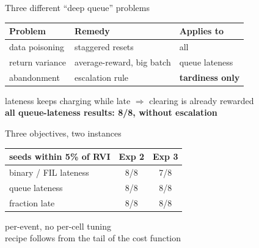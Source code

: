 \documentclass[12pt,aspectratio=169]{beamer}
\newcommand{\good}[1]{\textbf{#1}}
\begin{document}
\begin{frame}{Three different ``deep queue'' problems}

\begin{center}
\large
\begin{tabular}{lll}
\toprule
\textbf{Problem} & \textbf{Remedy} & \textbf{Applies to} \\
\midrule
data poisoning   & staggered resets            & all \\
return variance  & average-reward, big batch   & queue lateness \\
abandonment      & escalation rule             & \good{tardiness only} \\
\bottomrule
\end{tabular}
\end{center}

\vfill
\centering
lateness keeps charging while late $\Rightarrow$ clearing is already rewarded \\[4pt]
\good{all queue-lateness results: 8/8, without escalation}

\end{frame}

\begin{frame}{Three objectives, two instances}

\begin{center}
\Large
\begin{tabular}{lcc}
\toprule
seeds within 5\% of RVI & Exp 2 & Exp 3 \\
\midrule
binary / FIL lateness & 8/8 & 7/8 \\
queue lateness        & 8/8 & 8/8 \\
fraction late         & 8/8 & 8/8 \\
\bottomrule
\end{tabular}
\end{center}

\vfill
\centering
per-event, no per-cell tuning \\[6pt]
\small
recipe follows from the tail of the cost function

\end{frame}
\end{document}
